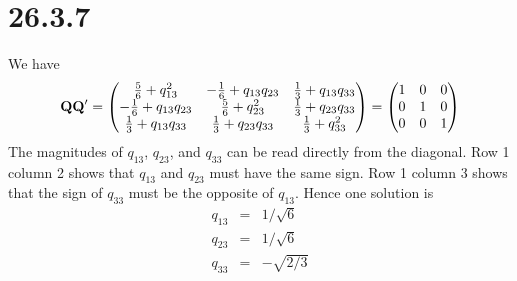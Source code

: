 \section*{26.3.7}
We have
$${\bf QQ}'=\left(\begin{matrix}
{5\over6}+q_{13}^2 & -{1\over6}+q_{13}q_{23} & {1\over3}+q_{13}q_{33}\cr
-{1\over6}+q_{13}q_{23} & {5\over6}+q_{23}^2 & {1\over3}+q_{23}q_{33}\cr
{1\over3}+q_{13}q_{33} & {1\over3}+q_{23}q_{33} & {1\over3}+q_{33}^2
\end{matrix}\right)=\left(\begin{matrix}
1 & 0 & 0\cr
0 & 1 & 0\cr
0 & 0 & 1
\end{matrix}\right)
$$
The magnitudes of $q_{13}$, $q_{23}$, and $q_{33}$ can be read directly from the diagonal.
Row 1 column 2 shows that $q_{13}$ and $q_{23}$ must have the same sign.
Row 1 column 3 shows that the sign of $q_{33}$ must be the opposite of $q_{13}$. Hence one solution is
\begin{eqnarray*}
q_{13}&=&1/\sqrt6\\
q_{23}&=&1/\sqrt6\\
q_{33}&=&-\sqrt{2/3}
\end{eqnarray*}
